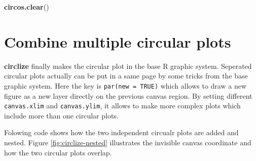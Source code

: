\documentclass[]{book}
\newenvironment{Shaded}{\begin{snugshade}}{\end{snugshade}}
\newcommand{\KeywordTok}[1]{\textcolor[rgb]{0.13,0.29,0.53}{\textbf{#1}}}
\newcommand{\NormalTok}[1]{#1}
\theoremstyle{definition}
\theoremstyle{definition}
\theoremstyle{remark}
\begin{document}
\begin{Shaded}
\begin{Highlighting}[]
\KeywordTok{circos.clear}\NormalTok{()}
\end{Highlighting}
\end{Shaded}

\section{Combine multiple circular plots}\label{combine-circular-plots}

\textbf{circlize} finally makes the circular plot in the base R graphic
system. Seperated circular plots actually can be put in a same page by
some tricks from the base graphic system. Here the key is
\texttt{par(new\ =\ TRUE)} which allows to draw a new figure as a new
layer directly on the previous canvas region. By setting different
\texttt{canvas.xlim} and \texttt{canvas.ylim}, it allows to make more
complex plots which include more than one circular plots.

Folowing code shows how the two independent circualr plots are added and
nested. Figure \ref{fig:circlize-nested} illustrates the invisible
canvas coordinate and how the two circular plots overlap.
\end{document}
